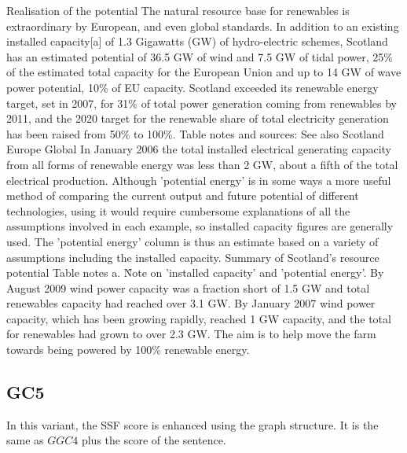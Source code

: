 \begin{tcolorbox}\footnotesize
	Realisation of the potential The natural resource base for renewables is extraordinary by European, and even global standards.
	In addition to an existing installed capacity[a] of 1.3 Gigawatts (GW) of hydro-electric schemes, Scotland has an estimated potential of 36.5 GW of wind and 7.5 GW of tidal power, 25\% of the estimated total capacity for the European Union and up to 14 GW of wave power potential, 10\% of EU capacity.
	Scotland exceeded its renewable energy target, set in 2007, for 31\% of total power generation coming from renewables by 2011, and the 2020 target for the renewable share of total electricity generation has been raised from 50\% to 100\%.
	Table notes and sources: See also Scotland Europe Global
	In January 2006 the total installed electrical generating capacity from all forms of renewable energy was less than 2 GW, about a fifth of the total electrical production.
	Although 'potential energy' is in some ways a more useful method of comparing the current output and future potential of different technologies, using it would require cumbersome explanations of all the assumptions involved in each example, so installed capacity figures are generally used.
	The 'potential energy' column is thus an estimate based on a variety of assumptions including the installed capacity.
	Summary of Scotland's resource potential Table notes a. \^ Note on 'installed capacity' and 'potential energy'.
	By August 2009 wind power capacity was a fraction short of 1.5 GW and total renewables capacity had reached over 3.1 GW.
	By January 2007 wind power capacity, which has been growing rapidly, reached 1 GW capacity, and the total for renewables had grown to over 2.3 GW.
	The aim is to help move the farm towards being powered by 100\% renewable energy.
\end{tcolorbox}

\subsection{GC5}

In this variant, the SSF score is enhanced using the graph structure. 
It is the same as $GGC4$ plus the score of the sentence.


